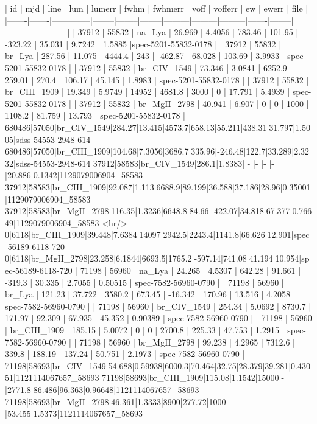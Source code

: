 

| id    | mjd   | line         | lum    | lumerr | fwhm   | fwhmerr | voff    | vofferr | ew     | ewerr  | file                 |
|-------|-------|--------------|--------|--------|--------|---------|---------|---------|-------|--------|----------------------|
| 37912 | 55832 | na_Lya       | 26.969 | 4.4056 | 783.46 |  101.95 | -323.22 |  35.031 | 9.7242 | 1.5885 |spec-5201-55832-0178 |
| 37912 | 55832 | br_Lya       | 287.56 | 11.075 | 4444.4 |     243 | -462.87 |  68.028 | 103.69 | 3.9933 |   spec-5201-55832-0178 |
| 37912 | 55832 | br_CIV_1549  | 73.346 | 3.0841 | 6252.9 |  259.01 |   270.4 |  106.17 | 45.145 | 1.8983 |   spec-5201-55832-0178 |
| 37912 | 55832 | br_CIII_1909 | 19.349 | 5.9749 |  14952 |  4681.8 |    3000 |       0 | 17.791 | 5.4939 |   spec-5201-55832-0178 |
| 37912 | 55832 | br_MgII_2798 | 40.941 |  6.907 |      0 |       0 |    1000 |  1108.2 | 81.759 | 13.793 |   spec-5201-55832-0178 |
680486|57050|br_CIV_1549|284.27|13.415|4573.7|658.13|55.211|438.31|31.797|1.5005|sdss-54553-2948-614
680486|57050|br_CIII_1909|104.68|7.3056|3686.7|335.96|-246.48|122.7|33.289|2.3232|sdss-54553-2948-614
37912|58583|br_CIV_1549|286.1|1.8383| - |- |- |- |20.886|0.1342|1129079006904_58583
37912|58583|br_CIII_1909|92.087|1.113|6688.9|89.199|36.588|37.186|28.96|0.35001|1129079006904_58583
37912|58583|br_MgII_2798|116.35|1.3236|6648.8|84.66|-422.07|34.818|67.377|0.76649|1129079006904_58583
<hr/>
0|6118|br_CIII_1909|39.448|7.6384|14097|2942.5|2243.4|1141.8|66.626|12.901|spec-56189-6118-720
0|6118|br_MgII_2798|23.258|6.1844|6693.5|1765.2|-597.14|741.08|41.194|10.954|spec-56189-6118-720
| 71198 | 56960 | na_Lya       | 24.265 | 4.5307 | 642.28 |  91.661 |  -319.3 |  30.335 |  2.7055 | 0.50515 |   spec-7582-56960-0790 |
| 71198 | 56960 | br_Lya       | 121.23 | 37.722 | 3580.2 |  673.45 | -16.342 |  170.96 |  13.516 |  4.2058 |   spec-7582-56960-0790 |
| 71198 | 56960 | br_CIV_1549  | 254.34 | 5.0692 | 8730.7 |  171.97 |  92.309 |  67.935 |  45.352 | 0.90389 |   spec-7582-56960-0790 |
| 71198 | 56960 | br_CIII_1909 | 185.15 | 5.0072 |      0 |       0 |  2700.8 |  225.33 |  47.753 |  1.2915 |   spec-7582-56960-0790 |
| 71198 | 56960 | br_MgII_2798 | 99.238 | 4.2965 | 7312.6 |   339.8 |  188.19 |  137.24 |  50.751 |  2.1973 |   spec-7582-56960-0790 |
71198|58693|br_CIV_1549|54.688|0.59938|6000.3|70.464|32.75|28.379|39.281|0.43051|1121114067657_58693
71198|58693|br_CIII_1909|115.08|1.1542|15000|-|2771.8|86.486|96.363|0.96648|1121114067657_58693
71198|58693|br_MgII_2798|46.361|1.3333|8900|277.72|1000|-|53.455|1.5373|1121114067657_58693
